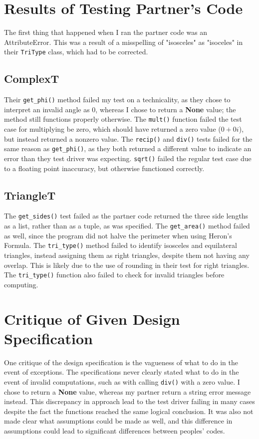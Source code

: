 \documentclass[12pt]{article}
\begin{document}
\section{Results of Testing Partner's Code}
The first thing that happened when I ran the partner code was an AttributeError. This was a result of a misspelling of "isosceles" as "isoceles" in their \verb|TriType| class, which had to be corrected.
\subsection*{ComplexT}
Their \verb|get_phi()| method failed my test on a technicality, as they chose to interpret an invalid angle as 0, whereas I chose to return a \textbf{None} value; the method still functions properly otherwise. The \verb|mult()| function failed the test case for multiplying be zero, which should have returned a zero value ($0+0i$), but instead returned a nonzero value.  The \verb|recip()| and \verb|div()| tests failed for the same reason as \verb|get_phi()|, as they both returned a different value to indicate an error than they test driver was expecting. \verb|sqrt()| failed the regular test case due to a floating point inaccuracy, but otherwise functioned correctly. 
\subsection*{TriangleT}
The \verb|get_sides()| test failed as the partner code returned the three side lengths as a list, rather than as a tuple, as was specified. The \verb|get_area()| method failed as well, since the program did not halve the perimeter when using Heron's Formula. The \verb|tri_type()| method failed to identify isosceles and equilateral triangles, instead assigning them as right triangles, despite them not having any overlap. This is likely due to the use of rounding in their test for right triangles. The \verb|tri_type()| function also failed to check for invalid triangles before computing. 

\section{Critique of Given Design Specification}
One critique of the design specification is the vagueness of what to do in the event of exceptions. The specifications never clearly stated what to do in the event of invalid computations, such as with calling  \verb|div()| with a zero value. I chose to return a \textbf{None} value, whereas my partner return a string error message instead. This discrepancy in approach lead to the test driver failing in many cases despite the fact the functions reached the same logical conclusion. It was also not made clear what assumptions could be made as well, and this difference in assumptions could lead to significant differences between peoples' codes. 
\end{document}

